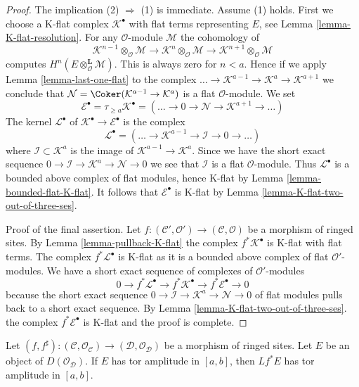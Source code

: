 \begin{proof}
The implication (2) $\Rightarrow$ (1) is immediate. Assume (1) holds.
First we choose a K-flat complex $\mathcal{K}^\bullet$
with flat terms representing $E$, see Lemma \ref{lemma-K-flat-resolution}.
For any $\mathcal{O}$-module $\mathcal{M}$ the cohomology of
$$
\mathcal{K}^{n - 1} \otimes_\mathcal{O} \mathcal{M} \to
\mathcal{K}^n \otimes_\mathcal{O} \mathcal{M} \to
\mathcal{K}^{n + 1} \otimes_\mathcal{O} \mathcal{M}
$$
computes $H^n(E \otimes_\mathcal{O}^\mathbf{L} \mathcal{M})$.
This is always zero for $n < a$. Hence if we apply
Lemma \ref{lemma-last-one-flat} to the complex
$\ldots \to \mathcal{K}^{a - 1} \to \mathcal{K}^a \to \mathcal{K}^{a + 1}$
we conclude that $\mathcal{N} = \Coker(\mathcal{K}^{a - 1} \to \mathcal{K}^a)$
is a flat $\mathcal{O}$-module. We set
$$
\mathcal{E}^\bullet = \tau_{\geq a}\mathcal{K}^\bullet =
(\ldots \to 0 \to \mathcal{N} \to \mathcal{K}^{a + 1} \to \ldots )
$$
The kernel $\mathcal{L}^\bullet$ of
$\mathcal{K}^\bullet \to \mathcal{E}^\bullet$ is the complex
$$
\mathcal{L}^\bullet = (\ldots \to \mathcal{K}^{a - 1} \to
\mathcal{I} \to 0 \to \ldots)
$$
where $\mathcal{I} \subset \mathcal{K}^a$ is the image of
$\mathcal{K}^{a - 1} \to \mathcal{K}^a$.
Since we have the short exact sequence
$0 \to \mathcal{I} \to \mathcal{K}^a \to \mathcal{N} \to 0$
we see that $\mathcal{I}$ is a flat $\mathcal{O}$-module.
Thus $\mathcal{L}^\bullet$ is a bounded
above complex of flat modules, hence K-flat by
Lemma \ref{lemma-bounded-flat-K-flat}.
It follows that $\mathcal{E}^\bullet$ is K-flat by
Lemma \ref{lemma-K-flat-two-out-of-three-ses}.

\medskip\noindent
Proof of the final assertion. Let
$f : (\mathcal{C}', \mathcal{O}') \to (\mathcal{C}, \mathcal{O})$
be a morphism of ringed sites. By Lemma \ref{lemma-pullback-K-flat}
the complex $f^*\mathcal{K}^\bullet$ is K-flat with flat terms.
The complex $f^*\mathcal{L}^\bullet$ is K-flat as it is a bounded
above complex of flat $\mathcal{O}'$-modules. We have a short exact
sequence of complexes of $\mathcal{O}'$-modules
$$
0 \to f^*\mathcal{L}^\bullet \to f^*\mathcal{K}^\bullet \to
f^*\mathcal{E}^\bullet \to 0
$$
because the short exact sequence
$0 \to \mathcal{I} \to \mathcal{K}^a \to \mathcal{N} \to 0$
of flat modules pulls back to a short exact sequence.
By Lemma \ref{lemma-K-flat-two-out-of-three-ses}.
the complex $f^*\mathcal{E}^\bullet$ is K-flat and the proof is complete.
\end{proof}

\begin{lemma}
\label{lemma-tor-amplitude-pullback}
Let $(f, f^\sharp) : (\mathcal{C}, \mathcal{O}_\mathcal{C}) \to
(\mathcal{D}, \mathcal{O}_\mathcal{D})$
be a morphism of ringed sites.
Let $E$ be an object of $D(\mathcal{O}_\mathcal{D})$.
If $E$ has tor amplitude in $[a, b]$,
then $Lf^*E$ has tor amplitude in $[a, b]$.
\end{lemma}


